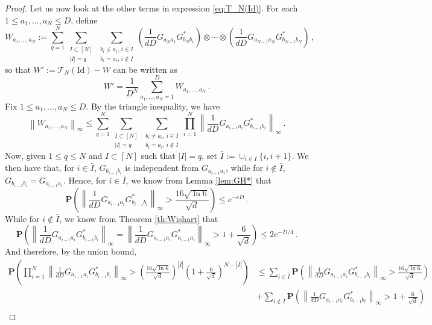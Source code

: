 \documentclass{amsart}
\renewcommand{\P}{\mathbf{P}}
\renewcommand{\leq}{\leqslant}
\newcommand{\Id}{\mathrm{Id}}
\begin{document}
\begin{proof}
    Let us now look at the other terms in expression \eqref{eq:T_N(Id)}. For each $1\leq a_1,\ldots,a_N\leq D$, define
    \[ W_{a_1,\ldots,a_N} := \sum_{q=1}^N \sum_{\substack{I\subset[N] \\ |I|=q}} \sum_{\substack{b_i\neq a_i,\,i\in I \\ b_i=a_i,\,i\notin I}} \left(\frac{1}{dD}G_{a_Na_1}G^*_{b_Nb_1} \right) \otimes\cdots\otimes \left(\frac{1}{dD}G_{a_{N-1}a_N}G^*_{b_{N-1}b_N} \right) \, , \]
    so that $W':=\mathcal T_N(\Id)-W$ can be written as
    \[ W'=\frac{1}{D^N} \sum_{a_1,\ldots,a_N=1}^D W_{a_1,\ldots,a_N} \, . \]
    Fix $1\leq a_1,\ldots,a_N\leq D$. By the triangle inequality, we have
    \[ \left\|W_{a_1,\ldots,a_N}\right\|_\infty \leq \sum_{q=1}^N \sum_{\substack{I\subset[N] \\ |I|=q}} \sum_{\substack{b_i\neq a_i,\,i\in I \\ b_i=a_i,\,i\notin I}} \prod_{i=1}^N \left\|\frac{1}{dD}G_{a_{i-1}a_i}G^*_{b_{i-1}b_i} \right\|_\infty \, .  \]
    Now, given $1\leq q\leq N$ and $I\subset[N]$ such that $|I|=q$, set $\bar{I}:=\cup_{i\in I}\{i,i+1\}$. We then have that, for $i\in\bar{I}$, $G_{b_{i-1}b_i}$ is independent from $G_{a_{i-1}a_i}$, while for $i\notin\bar{I}$, $G_{b_{i-1}b_i}=G_{a_{i-1}a_i}$. Hence, for $i\in\bar{I}$, we know from Lemma \ref{lem:GH*} that
    \[ \P\left( \left\|\frac{1}{dD}G_{a_{i-1}a_i}G^*_{b_{i-1}b_i} \right\|_\infty > \frac{16\sqrt{\ln 6}}{\sqrt{d}} \right) \leq e^{-cD} \, . \]
    While for $i\notin\bar{I}$, we know from Theorem \ref{th:Wishart} that
    \[ \P \left( \left\| \frac{1}{dD}G_{a_{i-1}a_i}G^*_{b_{i-1}b_i} \right\|_{\infty} = \left\| \frac{1}{dD}G_{a_{i-1}a_i}G^*_{a_{i-1}a_i} \right\|_{\infty} > 1+\frac{6}{\sqrt{d}} \right) \leq 2e^{-D/4} \, .  \]
    And therefore, by the union bound,
    \begin{align*}
        \P\left( \prod_{i=1}^N \left\|\frac{1}{dD}G_{a_{i-1}a_i}G^*_{b_{i-1}b_i} \right\|_\infty > \left(\frac{16\sqrt{\ln 6}}{\sqrt{d}}\right)^{|\bar{I}|} \left(1+\frac{6}{\sqrt{d}}\right)^{N-|\bar{I}|} \right) & \leq \sum_{i\in\bar{I}} \P\left( \left\|\frac{1}{dD}G_{a_{i-1}a_i}G^*_{b_{i-1}b_i} \right\|_\infty > \frac{16\sqrt{\ln 6}}{\sqrt{d}} \right) \\
                                                                                                                                                                                                                    & + \sum_{i\notin\bar{I}} \P\left( \left\|\frac{1}{dD}G_{a_{i-1}a_i}G^*_{b_{i-1}b_i} \right\|_\infty > 1+\frac{6}{\sqrt{d}} \right)            \\

\end{align*}
\end{proof}
\end{document}
